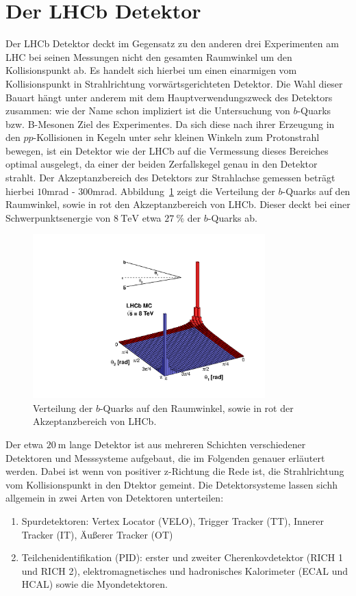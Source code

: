 \section{Der LHCb Detektor}
%
Der LHCb Detektor deckt im Gegensatz zu den anderen drei Experimenten am LHC bei seinen Messungen nicht den gesamten Raumwinkel um den Kollisionspunkt ab. Es handelt sich hierbei um einen einarmigen vom Kollisionspunkt in Strahlrichtung vorwärtsgerichteten Detektor. Die Wahl dieser Bauart hängt unter anderem mit dem Hauptverwendungszweck des Detektors zusammen: wie der Name schon impliziert ist die Untersuchung von $b$-Quarks bzw. B-Mesonen Ziel des Experimentes. Da sich diese nach ihrer Erzeugung in den $pp$-Kollisionen in Kegeln unter sehr kleinen Winkeln zum Protonstrahl bewegen, ist ein Detektor wie der LHCb auf die Vermessung dieses Bereiches optimal ausgelegt, da einer der beiden Zerfallskegel genau in den Detektor strahlt. Der Akzeptanzbereich des Detektors zur Strahlachse gemessen beträgt hierbei $10$mrad - $300$mrad. Abbildung~\ref{fig:lhcb_angle} zeigt die Verteilung der $b$-Quarks auf den Raumwinkel, sowie in rot den Akzeptanzbereich von LHCb. Dieser deckt bei einer Schwerpunktsenergie von $\SI{8}{\tera\electronvolt}$ etwa $\SI{27}{\percent}$ der $b$-Quarks ab\cite{rad}.\\
%
\begin{figure}[H]
  \centering
      \includegraphics[width=0.8\textwidth]{Plots/08_rad_acc_scheme_left.pdf}
  \caption{Verteilung der $b$-Quarks auf den Raumwinkel, sowie in rot der Akzeptanzbereich von LHCb\cite{rad_pic}.}
  \label{fig:lhcb_angle}
\end{figure}
%
Der etwa $\SI{20}{\meter}$ lange Detektor ist aus mehreren Schichten verschiedener Detektoren und Messsysteme aufgebaut, die im Folgenden genauer erläutert werden. Dabei ist wenn von positiver z-Richtung die Rede ist, die Strahlrichtung vom Kollisionspunkt in den Dtektor gemeint. Die Detektorsysteme lassen sichh allgemein in zwei Arten von Detektoren unterteilen:
%
\begin{enumerate}
  \item Spurdetektoren: Vertex Locator (VELO), Trigger Tracker (TT), Innerer Tracker (IT), Äußerer Tracker (OT)
  \item Teilchenidentifikation (PID): erster und zweiter Cherenkovdetektor (RICH 1 und RICH 2), elektromagnetisches und hadronisches Kalorimeter (ECAL und HCAL) sowie die Myondetektoren.
\end{enumerate}
